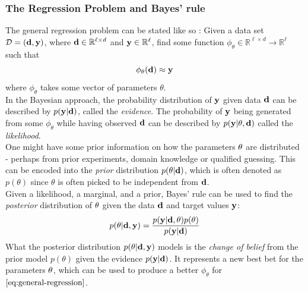 \subsubsection{The Regression Problem and Bayes' rule}
The general regression problem can be stated like so \cite{krause22}:
Given a data set $\mathcal{D} = (\mathbf{d}, \mathbf{y})$, where $\mathbf{d}\in \mathbb{R}^{\ell \times d}$ and $\mathbf{y} \in \mathbb{R}^{\ell}$,  find some function $\phi_\theta \in \mathbb{R}^{\ell \times d} \rightarrow \mathbb{R}^{\ell}$ such that
\begin{equation}
  \label{eq:general-regression}
\phi_\theta(\mathbf{d}) \approx \mathbf{y}
\end{equation}
where $\phi_\theta$ takes some vector of parameters $\theta$.\\
In the Bayesian approach, the probability distribution of $\mathbf{y}$ given data $\mathbf{d}$ can be described by $p(\mathbf{y} | \mathbf{d})$, called the \textit{evidence}.
The probability of $\mathbf{y}$ being generated from some $\phi_\theta$ while having observed $\mathbf{d}$ can be described by $p(\mathbf{y}|\theta, \mathbf{d})$
called the \textit{likelihood}.\\
One might have some prior information on how the parameters $\mathbf{\theta}$ are distributed - perhaps from prior experiments, domain knowledge or qualified guessing. This can be encoded into the \textit{prior} distribution $p(\mathbf{\theta}|\mathbf{d})$, which is often denoted as $p(\theta)$ since $\theta$ is often picked to be independent from $\mathbf{d}$.\\
Given a likelihood, a marginal, and a prior, 
Bayes' rule can be used to find the \textit{posterior} distribution of $\mathbf{\theta}$ given the data $\mathbf{d}$ and target values $\mathbf{y}$:
\begin{equation}
  \label{eq:bayes-rule}
  p(\mathbf{\theta} | \mathbf{d}, \mathbf{y}) = \frac{p(\mathbf{y} | \mathbf{d}, \mathbf{\theta})p(\mathbf{\theta})}{p(\mathbf{y| \mathbf{d}})}
\end{equation}
What the posterior distribution $p(\mathbf{\theta} | \mathbf{d}, \mathbf{y})$ models is the \textit{change of belief} from the prior model $p(\theta)$ given the evidence $p(\mathbf{y} | \mathbf{d})$\cite{krause22}.
It represents a new best bet for the parameters $\mathbf{\theta}$, which can be used to produce a better $\phi_\theta$ for $\eqref{eq:general-regression}$.
